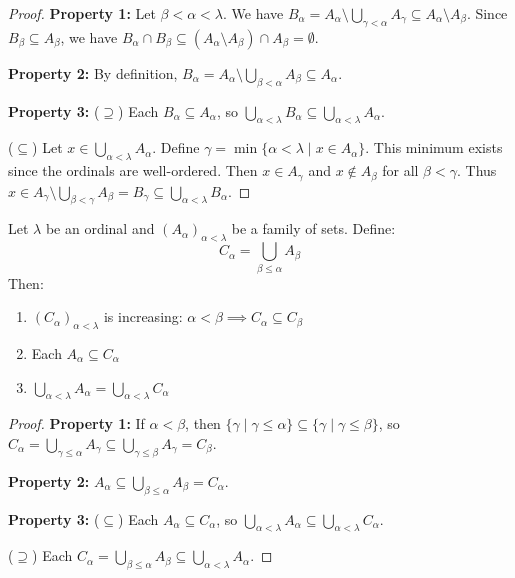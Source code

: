 \begin{proof}
\textbf{Property 1:} Let $\beta < \alpha < \lambda$. We have $B_\alpha = A_\alpha \setminus \bigcup_{\gamma < \alpha} A_\gamma \subseteq A_\alpha \setminus A_\beta$. Since $B_\beta \subseteq A_\beta$, we have $B_\alpha \cap B_\beta \subseteq (A_\alpha \setminus A_\beta) \cap A_\beta = \emptyset$.

\medskip
\textbf{Property 2:} By definition, $B_\alpha = A_\alpha \setminus \bigcup_{\beta < \alpha} A_\beta \subseteq A_\alpha$.

\medskip
\textbf{Property 3:} ($\supseteq$) Each $B_\alpha \subseteq A_\alpha$, so $\bigcup_{\alpha < \lambda} B_\alpha \subseteq \bigcup_{\alpha < \lambda} A_\alpha$.

($\subseteq$) Let $x \in \bigcup_{\alpha < \lambda} A_\alpha$. Define $\gamma = \min\{\alpha < \lambda \mid x \in A_\alpha\}$. This minimum exists since the ordinals are well-ordered. Then $x \in A_\gamma$ and $x \notin A_\beta$ for all $\beta < \gamma$. Thus $x \in A_\gamma \setminus \bigcup_{\beta < \gamma} A_\beta = B_\gamma \subseteq \bigcup_{\alpha < \lambda} B_\alpha$.
\end{proof}

\begin{lemma}
Let $\lambda$ be an ordinal and $(A_\alpha)_{\alpha < \lambda}$ be a family of sets. Define:
\[ C_\alpha = \bigcup_{\beta \leq \alpha} A_\beta \]
Then:
\begin{enumerate}
    \item $(C_\alpha)_{\alpha < \lambda}$ is increasing: $\alpha < \beta \implies C_\alpha \subseteq C_\beta$
    \item Each $A_\alpha \subseteq C_\alpha$
    \item $\bigcup_{\alpha < \lambda} A_\alpha = \bigcup_{\alpha < \lambda} C_\alpha$
\end{enumerate}
\end{lemma}

\begin{proof}
\textbf{Property 1:} If $\alpha < \beta$, then $\{\gamma \mid \gamma \leq \alpha\} \subseteq \{\gamma \mid \gamma \leq \beta\}$, so $C_\alpha = \bigcup_{\gamma \leq \alpha} A_\gamma \subseteq \bigcup_{\gamma \leq \beta} A_\gamma = C_\beta$.

\medskip
\textbf{Property 2:} $A_\alpha \subseteq \bigcup_{\beta \leq \alpha} A_\beta = C_\alpha$.

\medskip
\textbf{Property 3:} ($\subseteq$) Each $A_\alpha \subseteq C_\alpha$, so $\bigcup_{\alpha < \lambda} A_\alpha \subseteq \bigcup_{\alpha < \lambda} C_\alpha$.

($\supseteq$) Each $C_\alpha = \bigcup_{\beta \leq \alpha} A_\beta \subseteq \bigcup_{\alpha < \lambda} A_\alpha$.
\end{proof}

